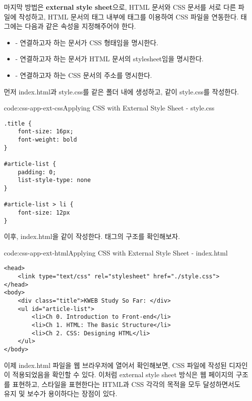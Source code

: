 마지막 방법은 \textbf{external style sheet}으로, HTML 문서와 CSS 문서를 서로 다른 파일에 작성하고, HTML 문서의  태그 내부에  태그를 이용하여 CSS 파일을 연동한다.  태그에는 다음과 같은 속성을 지정해주어야 한다.

\begin{itemize}
    \item {} - 연결하고자 하는 문서가 CSS 형태임을 명시한다.
    \item {} - 연결하고자 하는 문서가 HTML 문서의 stylesheet임을 명시한다.
    \item {} - 연결하고자 하는 CSS 문서의 주소를 명시한다.
\end{itemize}

먼저 index.html과 style.css를 같은 폴더 내에 생성하고, \와 같이 style.css를 작성한다.

\begin{codeenv}{code:css-app-ext-css}{Applying CSS with External Style Sheet - style.css}\begin{verbatim}
.title {
    font-size: 16px;
    font-weight: bold
}

#article-list {
    padding: 0;
    list-style-type: none
}

#article-list > li {
    font-size: 12px
}
\end{verbatim}
\end{codeenv}

이후, index.html을 \과 같이 작성한다.  태그의 구조를 확인해보자.

\begin{codeenv}{code:css-app-ext-html}{Applying CSS with External Style Sheet - index.html}\begin{verbatim}
<head>
    <link type="text/css" rel="stylesheet" href="./style.css">
</head>
<body>
    <div class="title">KWEB Study So Far: </div>
    <ul id="article-list">
        <li>Ch 0. Introduction to Front-end</li>
        <li>Ch 1. HTML: The Basic Structure</li>
        <li>Ch 2. CSS: Designing HTML</li>
    </ul>
</body>
\end{verbatim}
\end{codeenv}

이제 index.html 파일을 웹 브라우저에 열어서 확인해보면, CSS 파일에 작성된 디자인이 적용되었음을 확인할 수 있다. 이처럼 external style sheet 방식은 웹 페이지의 구조를 표현하고, 스타일을 표현한다는 HTML과 CSS 각각의 목적을 모두 달성하면서도 유지 및 보수가 용이하다는 장점이 있다.
